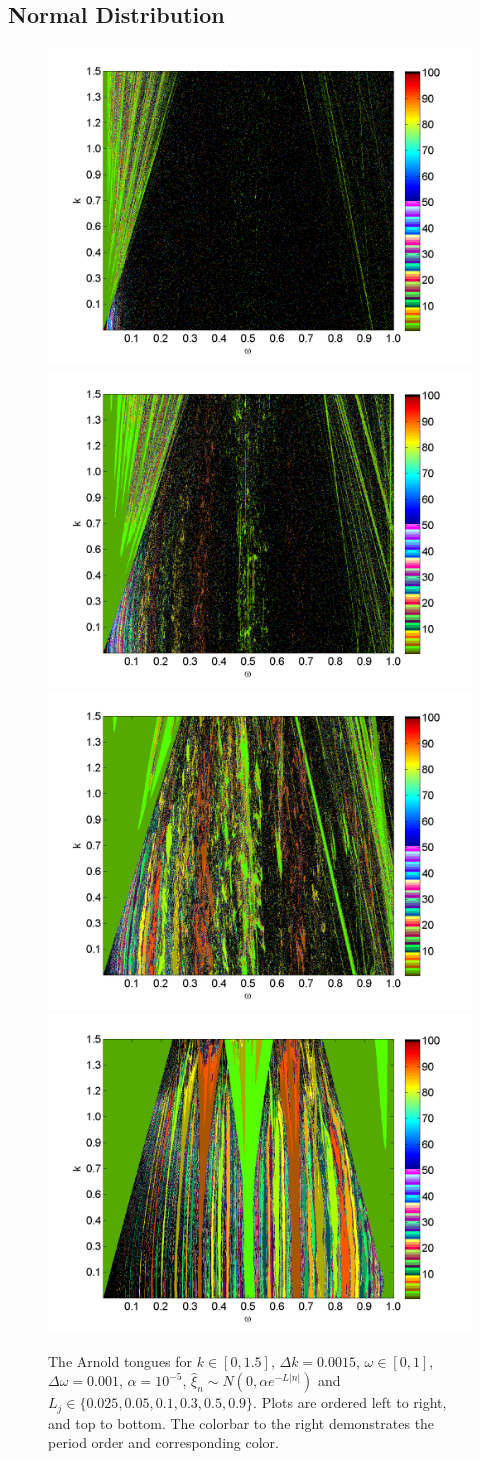 \subsection{Normal Distribution}
\begin{figure}[H]\linespread{1}  
\caption[The Arnold tongues for the random circle map, normal distribution]{The Arnold
  tongues for $k\in [0,1.5]$, $\Delta k = 0.0015$, $\omega \in [0,1]$,
  $\Delta \omega = 0.001$, $\alpha = 10^{-5}$, $\hat{\xi}_n\sim
  N(0,\alpha e^{-L|n|})$ and $L_j \in
  \{0.025,0.05,0.1,0.3,0.5,0.9\}$. Plots are ordered left to right, and top to bottom. The colorbar
to the right demonstrates the period order and corresponding color.}\label{fig:randtongues}
\centering
\includegraphics[width=.5\textwidth]{figs/tongues_norm_1000_L_0025.png}\hfill
\includegraphics[width=.5\textwidth]{figs/tongues_norm_1000_L_005.png}\\
\includegraphics[width=.5\textwidth]{figs/tongues_norm_1000_L_01.png}\hfill
\includegraphics[width=.5\textwidth]{figs/tongues_norm_1000_L_03.png}\\

\end{figure}
